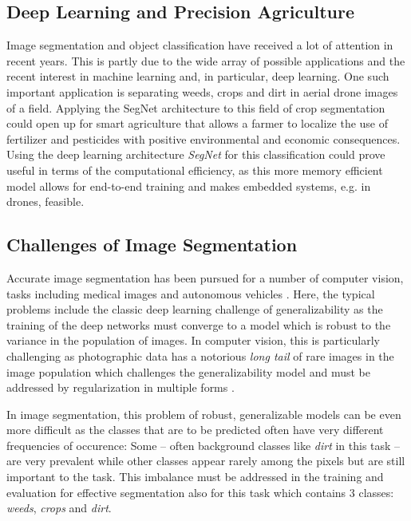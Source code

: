 \documentclass{article}
\begin{document}
\subsection{Deep Learning and Precision Agriculture}
Image segmentation and object classification have received a lot of attention in recent years.
This is partly due to the wide array of possible applications and the recent interest in machine learning and, in particular, deep learning.
One such important application is separating weeds, crops and dirt in aerial drone images of a field. Applying the SegNet architecture to this field of crop segmentation could open up for smart agriculture that allows a farmer to localize the use of fertilizer and pesticides with positive environmental and economic consequences.
Using the deep learning architecture \textit{SegNet} for this classification could prove useful in terms of the computational efficiency, as this more memory efficient model allows for end-to-end training and makes embedded systems, e.g. in drones, feasible.

\subsection{Challenges of Image Segmentation}
Accurate image segmentation has been pursued for a number of computer vision, tasks including medical images and autonomous vehicles \cite{seg}.
Here, the typical problems include the classic deep learning challenge of generalizability as the training of the deep networks must converge to a  model which is robust to the variance in the population of images.
In computer vision, this is particularly challenging as photographic data has a notorious \textit{long tail} of rare images in the image population which challenges the generalizability model and must be addressed by regularization in multiple forms \cite{long}.   

In image segmentation, this problem of robust, generalizable models can be even more difficult as the classes that are to be predicted often have very different frequencies of occurence: Some -- often background classes like \textit{dirt} in this task -- are very prevalent while other classes appear rarely among the pixels but are still important to the task. 
This imbalance must be addressed in the training and evaluation for effective segmentation also for this task which contains 3 classes: \textit{weeds}, \textit{crops} and \textit{dirt}.
\end{document}
